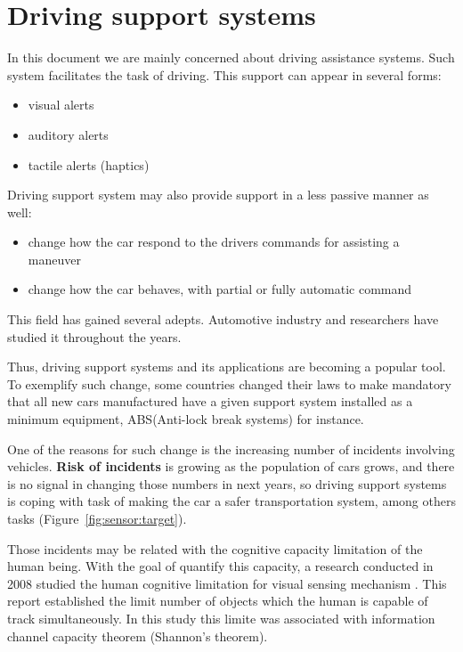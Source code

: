 \section{Driving support systems}

In this document we are mainly concerned about driving assistance systems. Such system facilitates the task of driving. This support can appear in several forms: 

\begin{itemize}
\item visual alerts
\item auditory alerts
\item tactile alerts (haptics\cite{riener2010sensor})
\end{itemize}

Driving support system may also provide support in a less passive manner as well:

\begin{itemize}
\item change how the car respond to the drivers commands for assisting a maneuver
\item change how the car behaves, with partial or fully automatic command
\end{itemize}

This field has gained several adepts. Automotive industry and researchers have studied it throughout the years.

Thus, driving support systems and its applications are becoming a popular tool. To exemplify such change, some countries changed their laws to make mandatory that all new cars manufactured have a given support system installed as a minimum equipment, ABS(Anti-lock break systems)  for instance.

One of the reasons for such change is the increasing number of incidents involving vehicles. \textbf{Risk of incidents} is growing as the population of cars grows, and there is no signal in changing those numbers in next years, so driving support systems is coping with task of making the car a safer transportation system, among others tasks (Figure~\ref{fig:sensor:target}).

Those incidents may be related with the cognitive capacity limitation of the human being. With the goal of quantify this capacity, a research conducted in 2008 studied the human cognitive limitation for visual sensing mechanism \cite{LautarutisV}. This report established the limit number of objects which the human is capable of track simultaneously. In this study this limite was associated with information channel capacity theorem (Shannon's theorem). 

